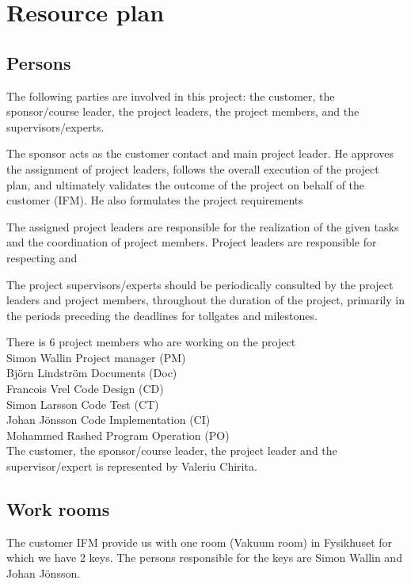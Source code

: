 \section{Resource plan}
\subsection{Persons}


The following parties are involved in this project: the customer, the sponsor/course leader, the project leaders, the project members, and the supervisors/experts.

The sponsor acts as the customer contact and main project leader. He approves the assignment of project leaders, follows the overall execution of the project plan, and ultimately validates the outcome of the project on behalf of the customer (IFM). He also formulates the project requirements 

The assigned project leaders are responsible for the realization of the given tasks and the coordination of project members. Project leaders are responsible for respecting and 

The project supervisors/experts should be periodically consulted by the project leaders and project members, throughout the duration of the project, primarily in the periods preceding the deadlines for tollgates and milestones.

There is 6 project members who are working on the project\\

Simon Wallin Project manager (PM)\\
Björn Lindström Documents (Doc)\\
Francois Vrel Code Design (CD)\\
Simon Larsson Code Test (CT)\\
Johan Jönsson Code Implementation (CI)\\
Mohammed Rashed Program Operation (PO)\\

The customer, the sponsor/course leader, the project leader and the supervisor/expert is represented by Valeriu Chirita.

\subsection{Work rooms}

The customer IFM provide us with one room (Vakuum room) in Fysikhuset for which we have 2 keys.
The persons responsible for the keys are Simon Wallin and Johan Jönsson.

